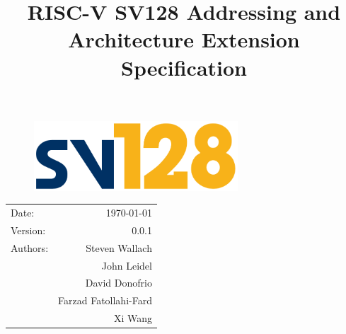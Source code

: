 \documentclass{article}
\title{\textbf{RISC-V SV128 Addressing and\\Architecture Extension Specification}} %
\date{} %
\begin{document}
\begin{figure}
\vspace{2in}
\begin{center}
\includegraphics[width=3in]{figures/sv128.pdf} %
\end{center}
\end{figure}

\maketitle %

\thispagestyle{fancy}

\begin{center}
\begin{tabular}{l r}
Date: & \today \\
Version: & 0.0.1 \\ %
Authors: & Steven Wallach\\
& John Leidel\\
& David Donofrio\\
& Farzad Fatollahi-Fard\\
& Xi Wang
\end{tabular}
\end{center}

\clearpage

\tableofcontents

\clearpage




\clearpage
\listoffigures
\listoftables
\clearpage
\end{document}
